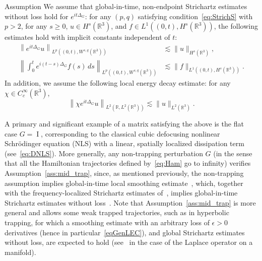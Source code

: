 \documentclass[AHL,Unicode,longabstracts,published]{cedram}
\newcommand*\R{\mathbb{R}}
\DeclareMathOperator{\I}{I}
\begin{document}
\begin{enonce}{Assumption} \label{ass:mid_trap}
We assume that global-in-time, non-endpoint Strichartz estimates without loss hold for $e^{it\Delta_G}$: for any $(p, q)$ satisfying condition~\eqref{eq:StrichS} with $p>2$, for any $s \geq 0$, $u \in H^s(\R^3)$, and $f \in L^1((0,t), H^s(\R^3))$, the following estimates hold with implicit constants independent of $t$:
\begin{align}
\left\| e^{it\Delta_G} u \right\|_{L^p\left((0,t), W^{s,q}(\R^3)\right)} &\lesssim \| u \|_{H^s(\R^3)},\label{eqStrichR31}
\\
\left\| \int_0^t e^{i(t-s)\Delta_G} f(s) \, ds \right\|_{L^p((0,t), W^{s,q}(\R^3))} &\lesssim \| f \|_{L^1\left((0,t),H^s(\R^3)\right)}.\label{eqStrichR32}
\end{align}
In addition, we assume the following local energy decay estimate: for any $\chi \in C^\infty_c(\R^3)$,
\begin{equation}\label{eqGenLEC}
\left\| \chi e^{it\Delta_G} u \right\|_{L^2(\R, L^2(\R ^3))} \lesssim \| u \|_{L^2(\R^3)}.
\end{equation}
\end{enonce}

A primary and significant example of a matrix satisfying the above is the flat case $G = \I$, corresponding to the classical cubic defocusing nonlinear Schr{\"o}dinger equation (NLS) with a linear, spatially localized dissipation term (see~\eqref{eq:DNLS}). More generally, any non-trapping perturbation $G$ (in the sense that all the Hamiltonian trajectories defined by~\eqref{eq:Ham} go to infinity) verifies Assumption~\ref{ass:mid_trap}, since, as mentioned previously, the non-trapping assumption implies global-in-time local smoothing estimate~\cite{BuGeTz04b}, which, together with the frequency-localized Strichartz estimates of~\cite{BuGeTz04}, implies global-in-time Strichartz estimates without loss~\cite{Iv10, StTa02}. Note that Assumption~\ref{ass:mid_trap} is more general and allows some weak trapped trajectories, such as in hyperbolic trapping, for which a smoothing estimate with an arbitrary loss of $\epsilon>0$ derivatives (hence in particular~\eqref{eqGenLEC}), and global Strichartz estimates without loss, are expected to hold (see~\cite{BuGuHa10} in the case of the Laplace operator on a manifold).
\end{document}
